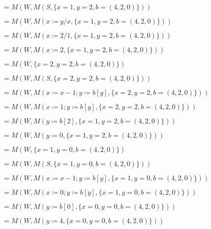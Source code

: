 \documentclass{article}
\begin{document}
\qquad \qquad \qquad \qquad \qquad $=M(W,M(S,\{x=1, y=2,b=(4,2,0)\}))$


\qquad \qquad \qquad \qquad \qquad $=M(W,M(x \coloneqq y/x,\{x=1, y=2,b=(4,2,0)\}))$

\qquad \qquad \qquad \qquad \qquad $=M(W,M(x \coloneqq 2/1,\{x=1, y=2,b=(4,2,0)\}))$

\qquad \qquad \qquad \qquad \qquad $=M(W,M(x \coloneqq 2,\{x=1, y=2,b=(4,2,0)\}))$

\qquad \qquad \qquad \qquad \qquad $=M(W,\{x=2, y=2,b=(4,2,0)\})$

\qquad \qquad \qquad \qquad \qquad $=M(W,M(S,\{x=2, y=2,b=(4,2,0)\}))$


\qquad \qquad \qquad \qquad \qquad $=M(W,M(x \coloneqq x-1; y \coloneqq b[y],\{x=2, y=2,b=(4,2,0)\}))$

\qquad \qquad \qquad \qquad \qquad $=M(W,M(x \coloneqq 1; y \coloneqq b[y],\{x=2, y=2,b=(4,2,0)\}))$

\qquad \qquad \qquad \qquad \qquad $=M(W,M(y \coloneqq b[2],\{x=1, y=2,b=(4,2,0)\}))$

\qquad \qquad \qquad \qquad \qquad $=M(W,M(y \coloneqq 0,\{x=1, y=2,b=(4,2,0)\}))$

\qquad \qquad \qquad \qquad \qquad $=M(W,\{x=1, y=0,b=(4,2,0)\})$

\qquad \qquad \qquad \qquad \qquad $=M(W,M(S,\{x=1, y=0,b=(4,2,0)\}))$


\qquad \qquad \qquad \qquad \qquad $=M(W,M(x \coloneqq x-1; y \coloneqq b[y],\{x=1, y=0,b=(4,2,0)\}))$

\qquad \qquad \qquad \qquad \qquad $=M(W,M(x \coloneqq 0; y \coloneqq b[y],\{x=1, y=0,b=(4,2,0)\}))$

\qquad \qquad \qquad \qquad \qquad $=M(W,M(y \coloneqq b[0],\{x=0, y=0,b=(4,2,0)\}))$

\qquad \qquad \qquad \qquad \qquad $=M(W,M(y \coloneqq 4,\{x=0, y=0,b=(4,2,0)\}))$
\end{document}
